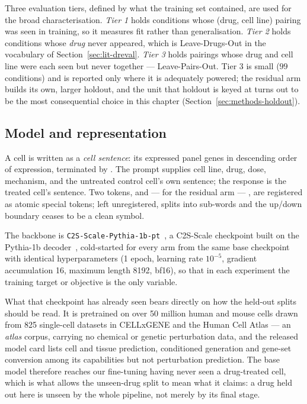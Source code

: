 Three evaluation tiers, defined by what the training set contained, are used for the broad
characterisation. \emph{Tier 1} holds conditions whose (drug, cell line) pairing was seen in
training, so it measures fit rather than generalisation. \emph{Tier 2} holds conditions whose
\emph{drug} never appeared, which is Leave-Drugs-Out in the vocabulary of
Section~\ref{sec:lit-dreval}. \emph{Tier 3} holds pairings whose drug and cell line were each seen
but never together --- Leave-Pairs-Out. Tier 3 is small ($99$ conditions) and is reported only
where it is adequately powered; the residual arm builds its own, larger holdout, and the unit that
holdout is keyed at turns out to be the most consequential choice in this chapter
(Section~\ref{sec:methods-holdout}).

\subsection{Model and representation}
\label{sec:methods-model}

A cell is written as a \emph{cell sentence}: its expressed panel genes in descending order of
expression, terminated by \ENDCELL. The prompt supplies cell line, drug, dose, mechanism, and the
untreated control cell's own sentence; the response is the treated cell's sentence. Two tokens,
\ENDCELL{} and --- for the residual arm --- \DOWN{}, are registered as atomic special tokens; left
unregistered, \DOWN{} splits into sub-words and the up/down boundary ceases to be a clean symbol.

The backbone is \texttt{C2S-Scale-Pythia-1b-pt}~\cite{c2sscale}, a C2S-Scale checkpoint built on
the Pythia-1b decoder~\cite{pythia}, cold-started for every arm from the same base checkpoint with
identical hyperparameters (1 epoch, learning rate $10^{-5}$, gradient accumulation 16, maximum
length 8192, bf16), so that in each experiment the training target or objective is the only
variable.

What that checkpoint has already seen bears directly on how the held-out splits should be read. It
is pretrained on over 50 million human and mouse cells drawn from 825 single-cell datasets in
CELLxGENE and the Human Cell Atlas --- an \emph{atlas} corpus, carrying no chemical or genetic
perturbation data, and the released model card lists cell and tissue prediction, conditioned
generation and gene-set conversion among its capabilities but not perturbation prediction. The base
model therefore reaches our fine-tuning having never seen a drug-treated cell, which is what allows
the unseen-drug split to mean what it claims: a drug held out here is unseen by the whole pipeline,
not merely by its final stage.

